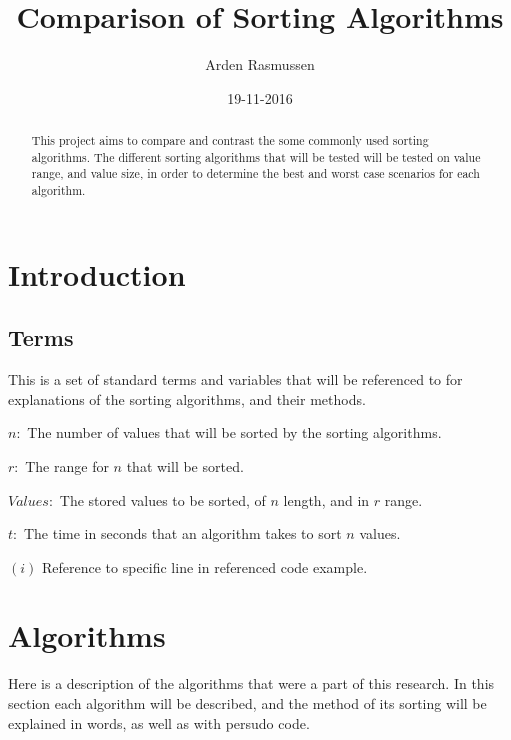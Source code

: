 \documentclass{article}
\title{Comparison of Sorting Algorithms}
\date{19-11-2016}
\author{Arden Rasmussen}
\begin{document}
\maketitle
\newpage
\tableofcontents
\newpage
{}
\begin{abstract}
This project aims to compare and contrast the some commonly used sorting algorithms. The different sorting algorithms that will be tested will be tested on value range, and value size, in order to determine the best and worst case scenarios for each algorithm.
\end{abstract}
\section{Introduction}
\subsection{Terms}
This is a set of standard terms and variables that will be referenced to for explanations of the sorting algorithms, and their methods.

$n:$ The number of values that will be sorted by the sorting algorithms.

$r:$ The range for $n$ that will be sorted.

$Values:$ The stored values to be sorted, of $n$ length, and in $r$ range.

$t:$ The time in seconds that an algorithm takes to sort $n$ values.

$(i)$ Reference to specific line in referenced code example.

\newpage
\section{Algorithms}
Here is a description of the algorithms that were a part of this research. In this section each algorithm will be described, and the method of its sorting will be explained in words, as well as with persudo code.
\newpage
\end{document}
